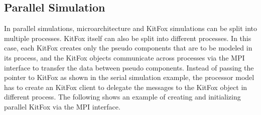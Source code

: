 \subsection{Parallel Simulation}
\noindent
In parallel simulations, microarchitecture and KitFox simulations can be split into multiple processes. 
KitFox itself can also be split into different processes. 
In this case, each KitFox creates only the pseudo components that are to be modeled in its process, and the KitFox objects communicate across processes via the MPI interface to transfer the data between pseudo components. 
Instead of passing the pointer to KitFox as shown in the serial simulation example, the processor model has to create an KitFox client to delegate the messages to the KitFox object in different process. 
The following shows an example of creating and initializing parallel KitFox via the MPI interface.
